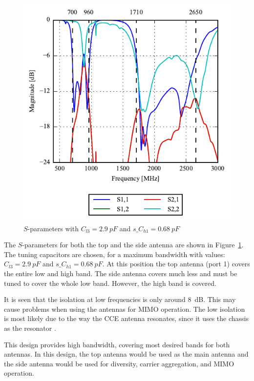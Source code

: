
\begin{figure}[htbp]
    \centering
    \includegraphics{img/tech_sol/nonresonant/simulation/freespace/Spara-static}
    \caption{$S$-parameters with $C_{l3} = \SI{2.9}{pF}$ and $s\_C_{h1} = \SI{0.68}{pF}$}
    \label{fig:ant3sparams}
\end{figure}

The $S$-parameters for both the top and the side antenna are shown in Figure~\ref{fig:ant3sparams}. The tuning capacitors are chosen, for a maximum bandwidth with values: $C_{l3} = \SI{2.9}{pF}$ and $s\_C_{h1} = \SI{0.68}{pF}$. At this position the top antenna (port 1) covers the entire low and high band. The side antenna covers much less and must be tuned to cover the whole low band. However, the high band is covered. 

It is seen that the isolation at low frequencies is only around \SI{8}{dB}. This may cause problems when using the antennas for MIMO operation. The low isolation is most likely due to the way the CCE antenna resonates, since it uses the chassis as the resonator \cite{ilvonen2014design}.

This design provides high bandwidth, covering most desired bands for both antennas. In this design, the top antenna would be used as the main antenna and the side antenna would be used for diversity, carrier aggregation, and MIMO operation. 

